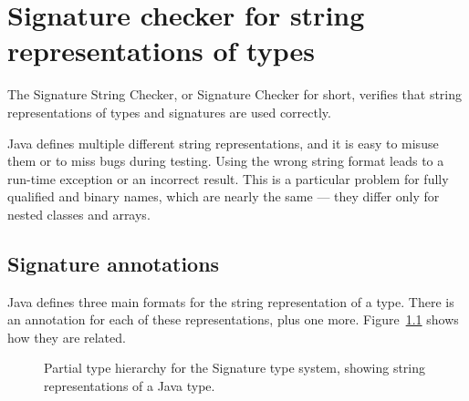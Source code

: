 \htmlhr
\chapter{Signature checker for string representations of types\label{signature-checker}}

The Signature String Checker, or Signature Checker for short, verifies that
string representations of types and signatures are used correctly.

Java defines multiple different string representations, and it is easy to
misuse them or to miss bugs during testing.  Using the wrong string format
leads to a run-time exception or an incorrect result.  This is a particular
problem for fully qualified and binary names, which are nearly the same ---
they differ only for nested classes and arrays.


\section{Signature annotations\label{signature-annotations}}

Java defines three main formats for the string representation of a type.
There is an annotation for each of these representations, plus one more.
Figure~\ref{fig:signature-hierarchy} shows how they are related.

\begin{figure}
\caption{Partial type hierarchy for the Signature type system, showing
  string representations of a Java type.}
\label{fig:signature-hierarchy}
\end{figure}


